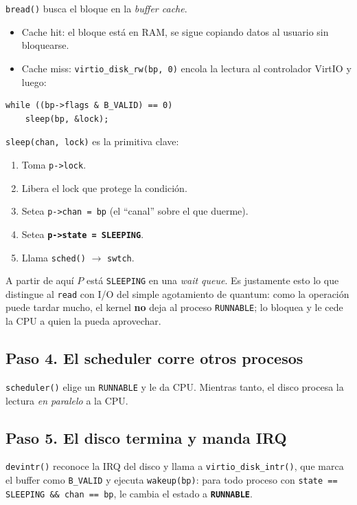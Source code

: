 \documentclass[11pt,a4paper]{article}
\begin{document}
\texttt{bread()} busca el bloque en la \emph{buffer cache}.

\begin{itemize}[leftmargin=*,nosep]
    \item Cache hit: el bloque está en RAM, se sigue copiando datos al
        usuario sin bloquearse.
    \item Cache miss: \texttt{virtio\_disk\_rw(bp, 0)} encola la
        lectura al controlador VirtIO y luego:
\end{itemize}

\begin{lstlisting}[style=cstyle]
while ((bp->flags & B_VALID) == 0)
    sleep(bp, &lock);
\end{lstlisting}

\texttt{sleep(chan, lock)} es la primitiva clave:

\begin{enumerate}[leftmargin=*,nosep]
    \item Toma \texttt{p->lock}.
    \item Libera el lock que protege la condición.
    \item Setea \texttt{p->chan = bp} (el ``canal'' sobre el que duerme).
    \item Setea \textbf{\texttt{p->state = SLEEPING}}.
    \item Llama \texttt{sched()} $\rightarrow$ \texttt{swtch}.
\end{enumerate}

A partir de aquí $P$ está \texttt{SLEEPING} en una \emph{wait queue}.
Es justamente esto lo que distingue al \texttt{read} con I/O del simple
agotamiento de quantum: como la operación puede tardar mucho, el kernel
\textbf{no} deja al proceso \texttt{RUNNABLE}; lo bloquea y le cede la
CPU a quien la pueda aprovechar.

\subsection*{Paso 4. El scheduler corre otros procesos}

\texttt{scheduler()} elige un \texttt{RUNNABLE} y le da CPU.
Mientras tanto, el disco procesa la lectura \emph{en paralelo} a la CPU.

\subsection*{Paso 5. El disco termina y manda IRQ}

\texttt{devintr()} reconoce la IRQ del disco y llama a
\texttt{virtio\_disk\_intr()}, que marca el buffer como
\texttt{B\_VALID} y ejecuta \texttt{wakeup(bp)}: para todo proceso con
\texttt{state == SLEEPING \&\& chan == bp}, le cambia el estado a
\textbf{\texttt{RUNNABLE}}.
\end{document}
